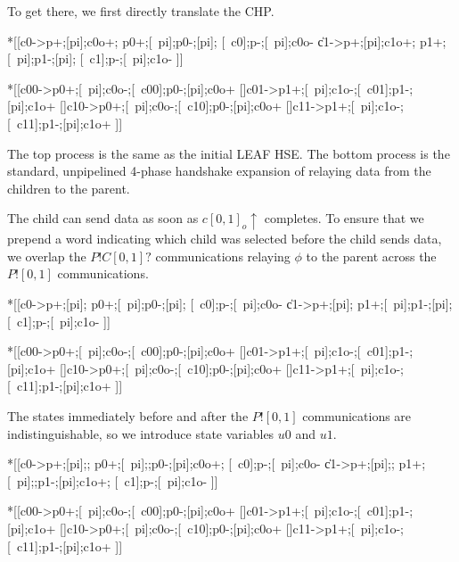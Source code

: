 \documentclass{article}
\begin{document}
\noindent
To get there, we first directly translate the CHP.

\begin{hse}
*[[c0\phi->p\phi+;[pi];c0o+;
    p0+;[~pi];p0-;[pi];
    [~c0\phi];p\phi-;[~pi];c0o-
  \|c1\phi->p\phi+;[pi];c1o+;
    p1+;[~pi];p1-;[pi];
    [~c1\phi];p\phi-;[~pi];c1o-
 ]]
\end{hse}

\begin{hse}
*[[c00->p0+;[~pi];c0o-;[~c00];p0-;[pi];c0o+
  []c01->p1+;[~pi];c1o-;[~c01];p1-;[pi];c1o+
  []c10->p0+;[~pi];c0o-;[~c10];p0-;[pi];c0o+
  []c11->p1+;[~pi];c1o-;[~c11];p1-;[pi];c1o+
 ]]
\end{hse}

\noindent
The top process is the same as the initial LEAF HSE. The bottom process is the 
standard, unpipelined 4-phase handshake expansion of relaying data from the 
children to the parent.

\noindent
The child can send data as soon as $c[0,1]_o\!\uparrow$ completes.
To ensure that we prepend a word indicating which child was selected before
the child sends data, we overlap the $P!C[0,1]?$ communications relaying
$\phi$ to the parent across the $P![0,1]$ communications.

\begin{hse}
*[[c0\phi->p\phi+;[pi];
    p0+;[~pi];p0-;[pi];
    [~c0\phi];p\phi-;[~pi];c0o-
  \|c1\phi->p\phi+;[pi];
    p1+;[~pi];p1-;[pi];
    [~c1\phi];p\phi-;[~pi];c1o-
 ]]
\end{hse}

\begin{hse}
*[[c00->p0+;[~pi];c0o-;[~c00];p0-;[pi];c0o+
  []c01->p1+;[~pi];c1o-;[~c01];p1-;[pi];c1o+
  []c10->p0+;[~pi];c0o-;[~c10];p0-;[pi];c0o+
  []c11->p1+;[~pi];c1o-;[~c11];p1-;[pi];c1o+
 ]]
\end{hse}

\noindent
The states immediately before and after the $P![0,1]$ communications are
indistinguishable, so we introduce state variables $u0$ and $u1$.

\begin{hse}
*[[c0\phi->p\phi+;[pi];;
    p0+;[~pi];;p0-;[pi];c0o+;
    [~c0\phi];p\phi-;[~pi];c0o-
  \|c1\phi->p\phi+;[pi];;
    p1+;[~pi];;p1-;[pi];c1o+;
    [~c1\phi];p\phi-;[~pi];c1o-
 ]]
\end{hse}

\begin{hse}
*[[c00->p0+;[~pi];c0o-;[~c00];p0-;[pi];c0o+
  []c01->p1+;[~pi];c1o-;[~c01];p1-;[pi];c1o+
  []c10->p0+;[~pi];c0o-;[~c10];p0-;[pi];c0o+
  []c11->p1+;[~pi];c1o-;[~c11];p1-;[pi];c1o+
 ]]
\end{hse}
\end{document}
